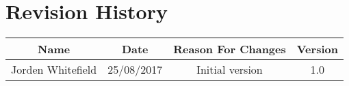 \chapter*{Revision History}

\begin{center}
  \begin{tabular}{|c|c|c|c|}
   \hline
   Name              & Date       & Reason For Changes & Version \\
   \hline
   Jorden Whitefield & 25/08/2017 & Initial version    & 1.0     \\
   \hline
  \end{tabular}
\end{center}
